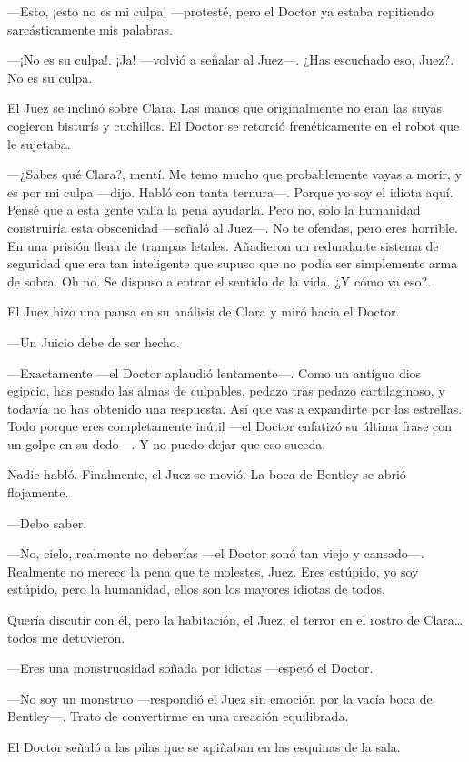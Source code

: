 ---Esto, ¡esto no es mi culpa! ---protesté, pero el Doctor ya estaba
repitiendo sarcásticamente mis palabras.

---¡No es su culpa!. ¡Ja! ---volvió a señalar al Juez---. ¿Has escuchado
eso, Juez?. No es su culpa.

El Juez se inclinó sobre Clara. Las manos que originalmente no eran las
suyas cogieron bisturís y cuchillos. El Doctor se retorció
frenéticamente en el robot que le sujetaba.

---¿Sabes qué Clara?, mentí. Me temo mucho que probablemente vayas a
morir, y es por mi culpa ---dijo. Habló con tanta ternura---. Porque yo
soy el idiota aquí. Pensé que a esta gente valía la pena ayudarla. Pero
no, solo la humanidad construiría esta obscenidad ---señaló al Juez---.
No te ofendas, pero eres horrible. En una prisión llena de trampas
letales. Añadieron un redundante sistema de seguridad que era tan
inteligente que supuso que no podía ser simplemente arma de sobra. Oh
no. Se dispuso a entrar el sentido de la vida. ¿Y cómo va eso?.

El Juez hizo una pausa en su análisis de Clara y miró hacia el Doctor.

---Un Juicio debe de ser hecho.

---Exactamente ---el Doctor aplaudió lentamente---. Como un antiguo dios
egipcio, has pesado las almas de culpables, pedazo tras pedazo
cartilaginoso, y todavía no has obtenido una respuesta. Así que vas a
expandirte por las estrellas. Todo porque eres completamente inútil
---el Doctor enfatizó su última frase con un golpe en su dedo---. Y no
puedo dejar que eso suceda.

Nadie habló. Finalmente, el Juez se movió. La boca de Bentley se abrió
flojamente.

---Debo saber.

---No, cielo, realmente no deberías ---el Doctor sonó tan viejo y
cansado---. Realmente no merece la pena que te molestes, Juez. Eres
estúpido, yo soy estúpido, pero la humanidad, ellos son los mayores
idiotas de todos.

Quería discutir con él, pero la habitación, el Juez, el terror en el
rostro de Clara\ldots{} todos me detuvieron.

---Eres una monstruosidad soñada por idiotas ---espetó el Doctor.

---No soy un monstruo ---respondió el Juez sin emoción por la vacía boca
de Bentley---. Trato de convertirme en una creación equilibrada.

El Doctor señaló a las pilas que se apiñaban en las esquinas de la sala.

